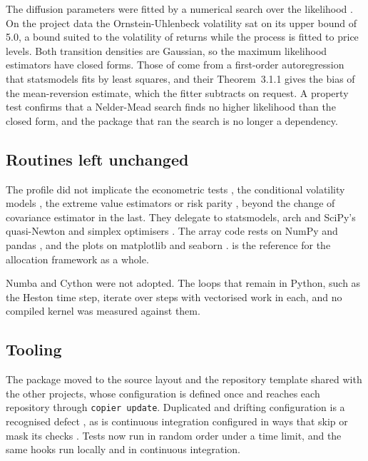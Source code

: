The diffusion parameters were fitted by a numerical search over the likelihood
\citep{aitsahalia_maximum_2002}. On the project data the Ornstein-Uhlenbeck
volatility sat on its upper bound of 5.0, a bound suited to the volatility of
returns while the process is fitted to price levels. Both transition densities
are Gaussian, so the maximum likelihood estimators have closed forms. Those of
\citet{tang_parameter_2009} come from a first-order autoregression that
statsmodels fits by least squares, and their Theorem~3.1.1 gives the bias of
the mean-reversion estimate, which the fitter subtracts on request. A property
test confirms that a Nelder-Mead search finds no higher likelihood than the
closed form, and the package that ran the search is no longer a dependency.

\subsection{Routines left unchanged}

The profile did not implicate the econometric tests
\citep{jarque_efficient_1980,dickey_distribution_1979,ljung_measure_1978,breusch_simple_1979,koenker_note_1981,ploberger_cusum_1992},
the conditional volatility models
\citep{engle_autoregressive_1982,bollerslev_generalized_1986,nelson_conditional_1991,glosten_relation_1993,tsay_analysis_2010},
the extreme value estimators
\citep{balkema_residual_1974,pickands_statistical_1975,hill_simple_1975,embrechts_modelling_1997,mcneil_estimation_2000}
or risk parity
\citep{maillard_properties_2010,spinu_algorithm_2013,roncalli_introduction_2013},
beyond the change of covariance estimator in the last. They delegate to
statsmodels, arch and SciPy's quasi-Newton and simplex optimisers
\citep{nocedal_numerical_2006,byrd_limited_1995,nelder_simplex_1965}. The
array code rests on NumPy and pandas
\citep{harris_array_2020,vanderwalt_numpy_2011,mckinney_data_2010}, and the
plots on matplotlib and seaborn
\citep{hunter_matplotlib_2007,waskom_seaborn_2021}.
\citet{meucci_risk_2005} is the reference for the allocation framework as a
whole.

Numba \citep{lam_numba_2015} and Cython \citep{behnel_cython_2011} were not
adopted. The loops that remain in Python, such as the Heston time step,
iterate over steps with vectorised work in each, and no compiled kernel was
measured against them.

\subsection{Tooling}

The package moved to the source layout and the repository template shared
with the other projects, whose configuration is defined once and reaches each
repository through \texttt{copier update}. Duplicated and drifting
configuration is a recognised defect
\citep{sharma_configuration_2016}, as is continuous integration configured
in ways that skip or mask its checks \citep{gallaba_use_2020}. Tests now run
in random order under a time limit, and the same hooks run locally and in
continuous integration.
